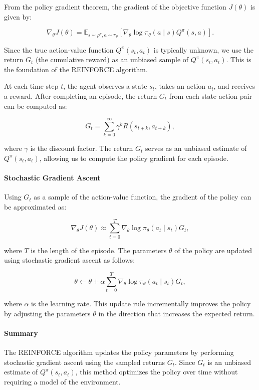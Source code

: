 \documentclass[10pt, oneside]{article}
\theoremstyle{definition}
\begin{document}
From the policy gradient theorem, the gradient of the objective function \( J(\theta) \) is given by:

\[
\nabla_\theta J(\theta) = \mathbb{E}_{s \sim \rho^\pi, a \sim \pi_\theta} \left[ \nabla_\theta \log \pi_\theta(a \mid s) Q^\pi(s, a) \right].
\]

Since the true action-value function \( Q^\pi(s_t, a_t) \) is typically unknown, we use the return \( G_t \) (the cumulative reward) as an unbiased sample of \( Q^\pi(s_t, a_t) \). This is the foundation of the REINFORCE algorithm.

At each time step \( t \), the agent observes a state \( s_t \), takes an action \( a_t \), and receives a reward. After completing an episode, the return \( G_t \) from each state-action pair can be computed as:

\[
G_t = \sum_{k=0}^{\infty} \gamma^k R(s_{t+k}, a_{t+k}),
\]

where \( \gamma \) is the discount factor. The return \( G_t \) serves as an unbiased estimate of \( Q^\pi(s_t, a_t) \), allowing us to compute the policy gradient for each episode.

\paragraph{Stochastic Gradient Ascent}

Using \( G_t \) as a sample of the action-value function, the gradient of the policy can be approximated as:

\[
\nabla_\theta J(\theta) \approx \sum_{t=0}^{T} \nabla_\theta \log \pi_\theta(a_t \mid s_t) G_t,
\]

where \( T \) is the length of the episode. The parameters \( \theta \) of the policy are updated using stochastic gradient ascent as follows:

\[
\theta \leftarrow \theta + \alpha \sum_{t=0}^{T} \nabla_\theta \log \pi_\theta(a_t \mid s_t) G_t,
\]

where \( \alpha \) is the learning rate. This update rule incrementally improves the policy by adjusting the parameters \( \theta \) in the direction that increases the expected return.

\paragraph{Summary}

The REINFORCE algorithm updates the policy parameters by performing stochastic gradient ascent using the sampled returns \( G_t \). Since \( G_t \) is an unbiased estimate of \( Q^\pi(s_t, a_t) \), this method optimizes the policy over time without requiring a model of the environment.
\end{document}
